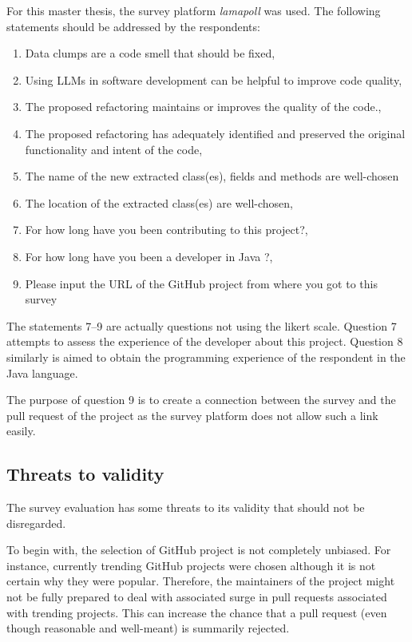 For this master thesis, the survey platform \textit{lamapoll} \cite{lamapoll} was used.  The following statements should be addressed by the respondents:
\begin{enumerate}
\item Data clumps are a code smell that should be fixed, 
\item Using LLMs in software development can be helpful to improve code quality,
\item The proposed refactoring maintains or improves the quality of the code.,
\item The proposed refactoring has  adequately identified and preserved the original functionality and intent of the code, 
\item The name of the new extracted class(es), fields and methods are well-chosen
 \item The location of the extracted class(es) are well-chosen,
 \item For how long have you been contributing to this project?,
\item For how long have you been a developer in Java ?, 
\item Please input the URL of the GitHub project from where you got to this survey

\end{enumerate}


The statements 7--9 are actually questions not using the likert scale. Question 7 attempts to assess the experience of the developer about this project. Question 8 similarly is aimed to obtain the programming experience of the respondent in the Java language.

The purpose of question 9 is to create a connection between the survey and the pull request of the project as the survey platform does not allow such a link easily. 
\subsection{Threats to validity}

The survey evaluation has some threats to its validity that should not be disregarded.

To begin with, the selection of GitHub project is not completely unbiased. For instance, currently trending GitHub projects were chosen although it is not certain why they were popular. Therefore, the maintainers of the project might not be fully prepared to deal with associated surge in pull requests associated with trending projects. This can increase the chance that a pull request (even though reasonable and well-meant) is summarily rejected. \cite{10.1145/3366423.3380272}

